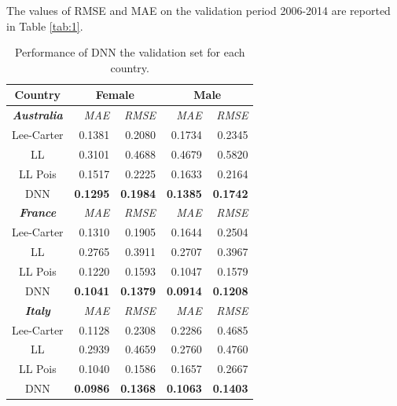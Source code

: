 \documentclass[a4,11pt]{article}
\begin{document}
The values of RMSE and MAE on the validation period 2006-2014 are reported in Table \ref{tab:1}.

\begin{table}[H]
\centering
\caption{Performance of DNN the validation set for each country.}
\small
\begin{tabular}{crrrr}
			\toprule
			\textbf{Country} &  \multicolumn{2}{c}{\textbf{Female}} & \multicolumn{2}{c}{\textbf{Male}}\\
\midrule
			\textbf{\textit{Australia}}   &   \textit{MAE} & \textit{RMSE} & \textit{MAE} & \textit{RMSE}  \\
			Lee-Carter                        &   0.1381	      & 0.2080	       &   0.1734         &      0.2345  	     	\\	
               		LL                                    &   0.3101        & 0.4688         	&   0.4679         &      0.5820   		\\	
			LL Pois                             &   0.1517        & 0.2225  		&   0.1633         &      0.2164   		\\			
			DNN                                 &   \textbf{0.1295}       &\textbf{0.1984}	&   \textbf{0.1385}       &     \textbf{0.1742} 		\\
\midrule
	               \textbf{\textit{France}}      &   \textit{MAE} & \textit{RMSE} & \textit{MAE} & \textit{RMSE} \\
               		Lee-Carter                      &  0.1310    &    0.1905 	&   0.1644   &   0.2504\\	
                   	LL                                  &  0.2765    &    0.3911   	&   0.2707   &  0.3967	\\	
			LL Pois                           &	  0.1220   &    0.1593   	&   0.1047   &  0.1579	\\			
			DNN                               &   \textbf{0.1041}   &    \textbf{0.1379}   	&  \textbf{ 0.0914}   &  \textbf{0.1208}	\\
\midrule
			\textbf{\textit{Italy}}        &   \textit{MAE} & \textit{RMSE} & \textit{MAE} & \textit{RMSE}  \\
                 	Lee-Carter                      &	  0.1128      &  0.2308             &	 0.2286   &    0.4685	\\	
			LL                                  &   0.2939      &  0.4659   	    &   0.2760   &    0.4760	\\	
			LL Pois                           &	  0.1040      &  0.1586  	    &   0.1657   &    0.2667	\\			
			DNN                               & \textbf{0.0986}      &   \textbf{0.1368}   &   \textbf{0.1063}   &    \textbf{0.1403}	\\
                   	

\end{tabular}
\end{table}
\end{document}
